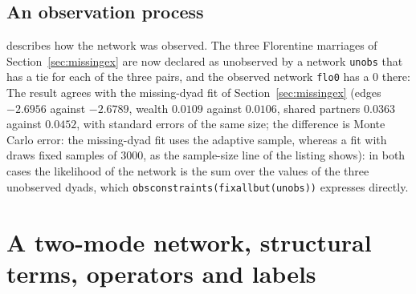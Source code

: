 \subsection{An observation process}\label{sec:obsex}

 describes how the network was observed. The three Florentine marriages of Section~\ref{sec:missingex} are now declared as unobserved by a network \texttt{unobs} that has a tie for each of the three pairs, and the observed network \texttt{flo0} has a 0 there:
The result agrees with the missing-dyad fit of Section~\ref{sec:missingex} (edges $-2.6956$ against $-2.6789$, wealth $0.0109$ against $0.0106$, shared partners $0.0363$ against $0.0452$, with standard errors of the same size; the difference is Monte Carlo error: the missing-dyad fit uses the adaptive sample, whereas a fit with  draws fixed samples of 3000, as the sample-size line of the listing shows): in both cases the likelihood of the network is the sum over the values of the three unobserved dyads, which \texttt{obsconstraints(fixallbut(unobs))} expresses directly.

\section{A two-mode network, structural terms, operators and labels}\label{sec:twomode}


